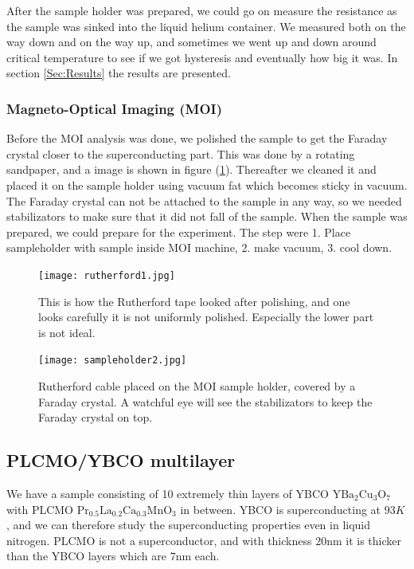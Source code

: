 \documentclass{comjnl}
\newcommand*\chem[1]{\ensuremath{\mathrm{#1}}}
\begin{document}
After the sample holder was prepared, we could go on measure the resistance as the sample was sinked into the liquid helium container. We measured both on the way down and on the way up, and sometimes we went up and down around critical temperature to see if we got hysteresis and eventually how big it was. In section \ref{Sec:Results} the results are presented.

\subsubsection{Magneto-Optical Imaging (MOI)}
Before the MOI analysis was done, we polished the sample to get the Faraday crystal closer to the superconducting part. This was done by a rotating sandpaper, and a image is shown in figure (\ref{fig:rutherford1}). Thereafter we cleaned it and placed it on the sample holder using vacuum fat which becomes sticky in vacuum. The Faraday crystal can not be attached to the sample in any way, so we needed stabilizators to make sure that it did not fall of the sample. When the sample was prepared, we could prepare for the experiment. The step were 1. Place sampleholder with sample inside MOI machine, 2. make vacuum, 3. cool down. 
\begin{figure}[h]
\centering
\texttt{[image: rutherford1.jpg]}
\caption{This is how the Rutherford tape looked after polishing, and one looks carefully it is not uniformly polished. Especially the lower part is not ideal. \label{fig:rutherford1}}
\end{figure}
\begin{figure}[h]
\centering
\texttt{[image: sampleholder2.jpg]}
\caption{Rutherford cable placed on the MOI sample holder, covered by a Faraday crystal. A watchful eye will see the stabilizators to keep the Faraday crystal on top. \label{fig:sampleholder2}}
\end{figure}

\subsection{PLCMO/YBCO multilayer}
We have a sample consisting of 10 extremely thin layers of YBCO \chem{YBa_2Cu_3O_7} with PLCMO \chem{Pr_{0.5}La_{0.2}Ca_{0.3}MnO_3} in between. YBCO is superconducting at $93K$, and we can therefore study the superconducting properties even in liquid nitrogen. PLCMO is not a superconductor, and with thickness 20nm it is thicker than the YBCO layers which are 7nm each. 
\end{document}
